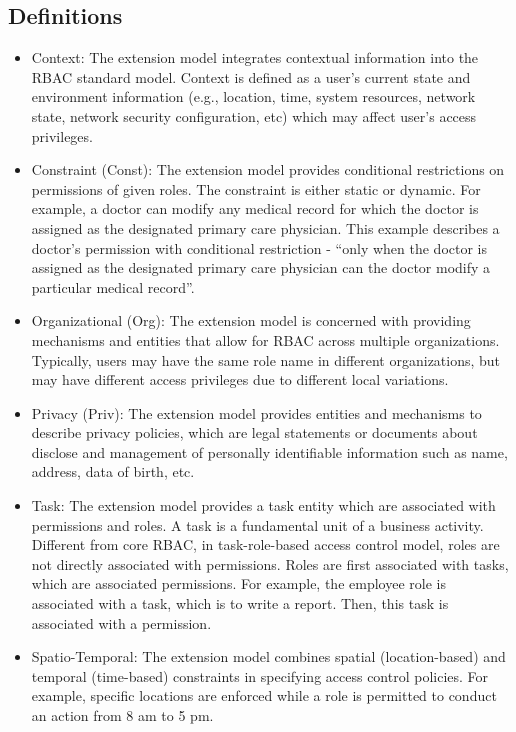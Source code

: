 \subsection{Definitions}

\begin{itemize}

  \item Context: The extension model integrates contextual information into the RBAC standard model. Context is defined as a user's current state and environment information (e.g., location, time, system resources, network state, network security configuration, etc) which may affect user's access privileges.

  \item Constraint (Const): The extension model provides conditional restrictions on permissions of given roles. The constraint is either static or dynamic. For example, a doctor can modify any medical record for which the doctor is assigned as the designated primary care physician. This example describes a doctor's permission with conditional restriction - ``only when the doctor is assigned as the designated primary care physician can the doctor modify a particular medical record''.

  \item Organizational (Org): The extension model is concerned with providing mechanisms and entities that allow for RBAC across multiple organizations. Typically, users may have the same role name in different organizations, but may have different access privileges due to different local variations.
  
  \item Privacy (Priv): The extension model provides entities and mechanisms to describe privacy policies, which are legal statements or documents about disclose and management of personally identifiable information such as name, address, data of birth, etc.
  
  \item Task: The extension model provides a task entity which are associated with permissions and roles. A task is a fundamental unit of a business activity. Different from core RBAC, in task-role-based access control model, roles are not directly associated with permissions. Roles are first associated with tasks, which are associated permissions. For example, the employee role is associated with a task, which is to write a report. Then, this task is associated with a permission.

  \item Spatio-Temporal: The extension model combines spatial (location-based) and temporal (time-based) constraints in specifying access control policies. For example, specific locations are enforced while a role is permitted to conduct an action from 8 am to 5 pm.


\end{itemize}
